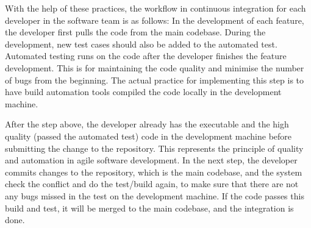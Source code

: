 With the help of these practices, the workflow \cite{fowler2006continuous} in continuous integration for each developer in the software team is as follows: In the development of each feature, the developer first pulls the code from the main codebase. During the development, new test cases should also be added to the automated test. Automated testing runs on the code after the developer finishes the feature development. This is for maintaining the code quality and minimise the number of bugs from the beginning. The actual practice for implementing this step is to have build automation tools compiled the code locally in the development machine. 
\par
After the step above, the developer already has the executable and the high quality (passed the automated test) code in the development machine before submitting the change to the repository. This represents the principle of quality and automation in agile software development. In the next step, the developer commits changes to the repository, which is the main codebase, and the system check the conflict and do the test/build again, to make sure that there are not any bugs missed in the test on the development machine.
If the code passes this build and test, it will be merged to the main codebase, and the integration is done.
